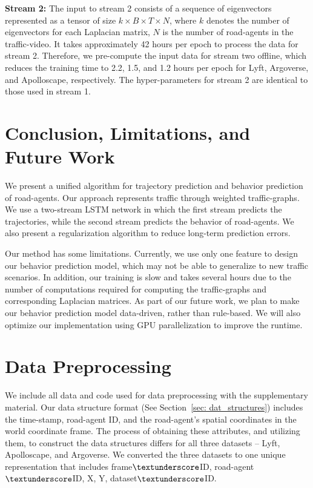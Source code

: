 \documentclass[10pt,twocolumn,letterpaper]{article}
\theoremstyle{plain}
\begin{document}
\textbf{Stream 2: }The input to stream 2 consists of a sequence of eigenvectors represented as a tensor of size $k \times B \times T \times N$, where $k$ denotes the number of eigenvectors for each Laplacian matrix, $N$ is the number of road-agents in the traffic-video. It takes approximately 42 hours per epoch to process the data for stream 2. Therefore, we pre-compute the input data for stream two offline, which reduces the training time to 2.2, 1.5, and 1.2 hours per epoch for Lyft, Argoverse, and Apolloscape, respectively. The hyper-parameters for stream 2 are identical to those used in stream 1.
\vspace{-5pt}
 \section{Conclusion, Limitations, and Future Work}

We present a unified algorithm for trajectory prediction and behavior prediction of road-agents. Our approach represents traffic through weighted traffic-graphs. We use a two-stream LSTM network in which the first stream predicts the trajectories, while the second stream predicts the behavior of road-agents. We also present a regularization algorithm to reduce long-term prediction errors.

Our method has some limitations. Currently, we use only one feature to design our behavior prediction model, which may not be able to generalize to new traffic scenarios. In addition, our training is slow and takes several hours due to the number of computations required for computing the traffic-graphs and corresponding Laplacian matrices. As part of our future work, we plan to make our behavior prediction model data-driven, rather than rule-based. We will also optimize our implementation using GPU parallelization to improve the runtime. 



{\small


}
\clearpage
\section{Data Preprocessing}
\label{sec: AppendixA}
We include all data and code used for data preprocessing with the supplementary material. Our data structure format (See Section~\ref{sec: dat_structures}) includes the time-stamp, road-agent ID, and the road-agent's spatial coordinates in the world coordinate frame. The process of obtaining these attributes, and utilizing them, to construct the data structures differs for all three datasets -- Lyft, Apolloscape, and Argoverse. We converted the three datasets to one unique representation that includes frame$\textunderscore$ID, road-agent$\textunderscore$ID, X, Y, dataset$\textunderscore$ID. 
\end{document}
